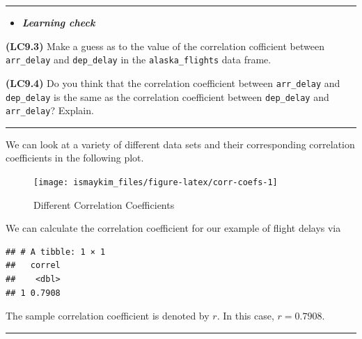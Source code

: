 \documentclass[]{tufte-book}
\newenvironment{Shaded}{\begin{snugshade}}{\end{snugshade}}
\newcommand{\KeywordTok}[1]{\textcolor[rgb]{0.13,0.29,0.53}{\textbf{{#1}}}}
\newcommand{\DataTypeTok}[1]{\textcolor[rgb]{0.13,0.29,0.53}{{#1}}}
\newcommand{\StringTok}[1]{\textcolor[rgb]{0.31,0.60,0.02}{{#1}}}
\newcommand{\NormalTok}[1]{{#1}}
\let\oldrule=\rule
\renewcommand{\rule}[1]{\oldrule{\linewidth}}
\newenvironment{rmdblock}[1]
  {\begin{shaded*}
  \begin{itemize}
  \renewcommand{\labelitemi}{
    \raisebox{-.7\height}[0pt][0pt]{
    }
  }
  \item
  }
  {
  \end{itemize}
  \end{shaded*}
  }
\newenvironment{learncheck}
  {\begin{rmdblock}{warning}}
  {\end{rmdblock}}
\begin{document}
\begin{center}\rule{0.5\linewidth}{\linethickness}\end{center}

\begin{learncheck}
\textbf{\emph{Learning check}}
\end{learncheck}

\textbf{(LC9.3)} Make a guess as to the value of the correlation
cofficient between \texttt{arr\_delay} and \texttt{dep\_delay} in the
\texttt{alaska\_flights} data frame.

\textbf{(LC9.4)} Do you think that the correlation coefficient between
\texttt{arr\_delay} and \texttt{dep\_delay} is the same as the
correlation coefficient between \texttt{dep\_delay} and
\texttt{arr\_delay}? Explain.

\begin{center}\rule{0.5\linewidth}{\linethickness}\end{center}

We can look at a variety of different data sets and their corresponding
correlation coefficients in the following plot.

\begin{figure}

{\centering \texttt{[image: ismaykim\_files/figure-latex/corr-coefs-1]} 

}

\caption[Different Correlation Coefficients]{Different Correlation Coefficients}\label{fig:corr-coefs}
\end{figure}

We can calculate the correlation coefficient for our example of flight
delays via

\begin{Shaded}
\end{Shaded}

\begin{verbatim}
## # A tibble: 1 × 1
##   correl
##    <dbl>
## 1 0.7908
\end{verbatim}

The sample correlation coefficient is denoted by \(r\). In this case,
\(r = 0.7908\).

\begin{center}\rule{0.5\linewidth}{\linethickness}\end{center}
\end{document}
